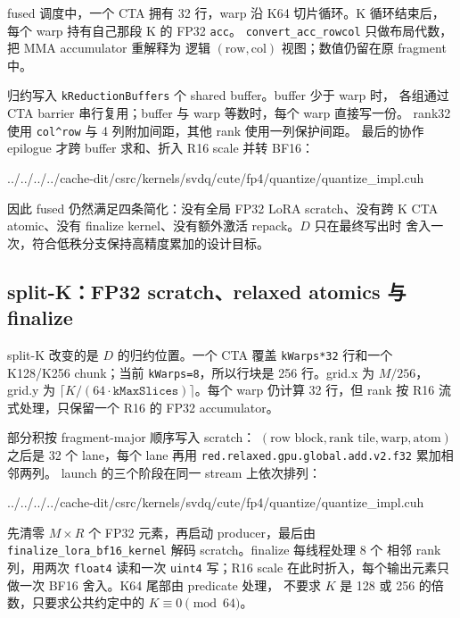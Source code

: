fused 调度中，一个 CTA 拥有 32 行，warp 沿 K64 切片循环。K 循环结束后，
每个 warp 持有自己那段 K 的 FP32 \texttt{acc}。
\texttt{convert\_acc\_rowcol} 只做布局代数，把 MMA accumulator 重解释为
逻辑 $(\text{row},\text{col})$ 视图；数值仍留在原 fragment 中。

归约写入 \texttt{kReductionBuffers} 个 shared buffer。buffer 少于 warp 时，
各组通过 CTA barrier 串行复用；buffer 与 warp 等数时，每个 warp 直接写一份。
rank32 使用 \texttt{col\^{}row} 与 4 列附加间距，其他 rank 使用一列保护间距。
最后的协作 epilogue 才跨 buffer 求和、折入 R16 scale 并转 BF16：

\begin{lstinputlisting}[linerange={730-745},firstnumber=auto,
  title={quantize\_impl.cuh L730-745（fused epilogue：归约、scale 与单次 BF16 舍入）}]{../../../../cache-dit/csrc/kernels/svdq/cute/fp4/quantize/quantize_impl.cuh}
\end{lstinputlisting}

因此 fused 仍然满足四条简化：没有全局 FP32 LoRA scratch、没有跨 K CTA
atomic、没有 finalize kernel、没有额外激活 repack。$D$ 只在最终写出时
舍入一次，符合低秩分支保持高精度累加的设计目标。

\subsection{split-K：FP32 scratch、relaxed atomics 与 finalize}

split-K 改变的是 $D$ 的归约位置。一个 CTA 覆盖 \texttt{kWarps*32} 行和一个
K128/K256 chunk；当前 \texttt{kWarps=8}，所以行块是 256 行。grid.x 为
$M/256$，grid.y 为 $\lceil K/(64\cdot\texttt{kMaxSlices})\rceil$。每个 warp
仍计算 32 行，但 rank 按 R16 流式处理，只保留一个 R16 的 FP32 accumulator。

部分积按 fragment-major 顺序写入 scratch：
$(\text{row block},\text{rank tile},\text{warp},\text{atom})$ 之后是 32 个
lane，每个 lane 再用 \texttt{red.relaxed.gpu.global.add.v2.f32} 累加相邻两列。
launch 的三个阶段在同一 stream 上依次排列：

\begin{lstinputlisting}[linerange={821-845},firstnumber=auto,
  title={quantize\_impl.cuh L821-845（split-K 的清零、producer 与 finalize）}]{../../../../cache-dit/csrc/kernels/svdq/cute/fp4/quantize/quantize_impl.cuh}
\end{lstinputlisting}

先清零 $M\times R$ 个 FP32 元素，再启动 producer，最后由
\texttt{finalize\_lora\_bf16\_kernel} 解码 scratch。finalize 每线程处理 8 个
相邻 rank 列，用两次 \texttt{float4} 读和一次 \texttt{uint4} 写；R16 scale
在此时折入，每个输出元素只做一次 BF16 舍入。K64 尾部由 predicate 处理，
不要求 $K$ 是 128 或 256 的倍数，只要求公共约定中的 $K\equiv0\pmod{64}$。

